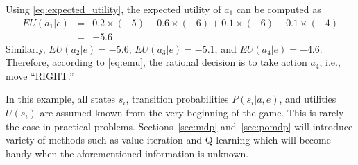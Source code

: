 Using \eqref{eq:expected_utility}, the expected utility of $a_1$ can be computed as
\begin{eqnarray}
	EU(a_1|e) &=& 0.2 \times (-5) + 0.6 \times (-6) + 0.1 \times (-6) + 0.1 \times (-4) \nonumber \\
	&=& -5.6 \nonumber
\end{eqnarray}
Similarly, $EU(a_2|e) = -5.6$, $EU(a_3|e) = -5.1$, and $EU(a_4|e) = -4.6$. Therefore, according to \eqref{eq:emu}, the rational decision is to take action $a_4$, i.e., move “RIGHT.”

In this example, all states $s_i$, transition probabilities $P(s_i|a,e)$, and utilities $U(s_i)$ are assumed known from the very beginning of the game. This is rarely the case in practical problems. Sections~\ref{sec:mdp} and~\ref{sec:pomdp} will introduce variety of methods such as value iteration and Q-learning which will become handy when the aforementioned information is unknown.


